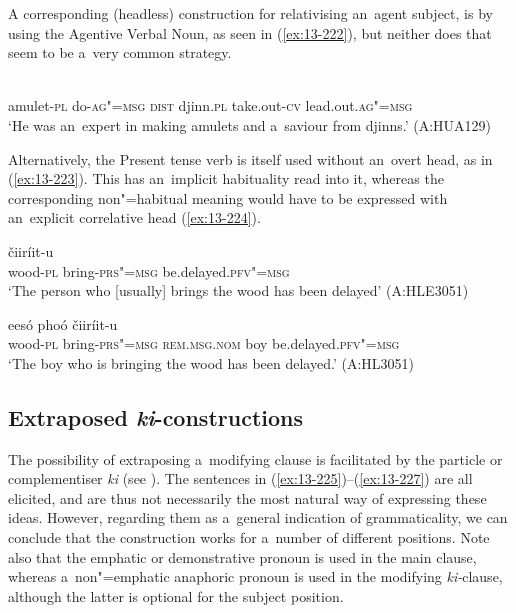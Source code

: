 A corresponding (headless) construction for relativising an~agent subject, is by using the Agentive Verbal Noun, as seen in (\ref{ex:13-222}), but neither does that seem to be a~very common strategy. 

\begin{exe}
\ex
\label{ex:13-222}
 \\
amulet-\textsc{pl} do-\textsc{ag"=msg} \textsc{dist} djinn.\textsc{pl} take.out-\textsc{cv} lead.out.\textsc{ag"=msg} \\
\glt `He was an~expert in making amulets and a~saviour from djinns.' (A:HUA129) 
\end{exe}

Alternatively, the Present tense verb is itself used without an~overt head, as in (\ref{ex:13-223}). This has an~implicit habituality read into it, whereas the corresponding non"=habitual meaning would have to be expressed with an~explicit correlative head (\ref{ex:13-224}).

\begin{exe}
\ex
\label{ex:13-223}
 čiiríit-u  \\
wood-\textsc{pl} bring-\textsc{prs"=msg} be.delayed.\textsc{pfv"=msg} \\
\glt `The person who [usually] brings the wood has been delayed' (A:HLE3051)

\ex
\label{ex:13-224}
 eesó phoó čiiríit-u  \\
wood-\textsc{pl} bring-\textsc{prs"=msg} \textsc{rem.ms}\textsc{g.}\textsc{nom} boy be.delayed.\textsc{pfv"=msg}  \\
\glt `The boy who is bringing the wood has been delayed.' (A:HL3051)
\end{exe}

\subsection{Extraposed \textit{ki}-constructions}
\label{subsec:13-6-7}

The possibility of extraposing a~modifying clause is facilitated by the particle or complementiser \textit{ki} (see ). The sentences in (\ref{ex:13-225})--(\ref{ex:13-227}) are all elicited, and are thus not necessarily the most natural way of expressing these ideas. However, regarding them as a~general indication of grammaticality, we can conclude that the construction works for a~number of different positions. Note also that the emphatic or demonstrative pronoun is used in the main clause, whereas a~non"=emphatic anaphoric pronoun is used in the modifying \textit{ki-}clause, although the latter is optional for the subject position.

